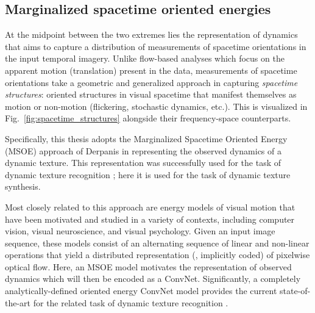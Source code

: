 \subsection{Marginalized spacetime oriented energies}

At the midpoint between the two extremes lies the representation of dynamics that aims to capture a distribution of measurements of spacetime orientations in the input temporal imagery. Unlike flow-based analyses which focus on the apparent motion (\ie translation) present in the data, measurements of spacetime orientations take a geometric and generalized approach in capturing \emph{spacetime structures}: oriented structures in visual spacetime that manifest themselves as motion or non-motion (\eg flickering, stochastic dynamics, etc.). This is visualized in Fig.\ \ref{fig:spacetime_structures} alongside their frequency-space counterparts. 
\clearpage

\clearpage

Specifically, this thesis adopts the Marginalized Spacetime Oriented Energy (MSOE) approach of Derpanis \etal \cite{derpanis2010role} in representing the observed dynamics of a dynamic texture. This representation was successfully used for the task of dynamic texture recognition \cite{derpanis2012spacetime}; here it is used for the task of dynamic texture synthesis.

Most closely related to this approach are energy models of visual
motion \cite{adelson1985spatiotemporal,heeger1988,simoncelli1998,nishimoto2011,derpanis2012spacetime,konda2014}
that have been motivated and studied in a variety of contexts,
including computer vision, visual neuroscience, and visual
psychology.
Given an input image sequence, these models consist of an
alternating sequence of linear and non-linear operations that yield
a distributed representation (\ie,  implicitly coded) of pixelwise
optical flow.
Here, an MSOE model motivates the
representation of observed dynamics which will then be encoded
as a ConvNet. Significantly, a completely analytically-defined
oriented energy ConvNet model provides the current state-of-the-art
for the related task of dynamic texture recognition \cite{hadji2017}.


